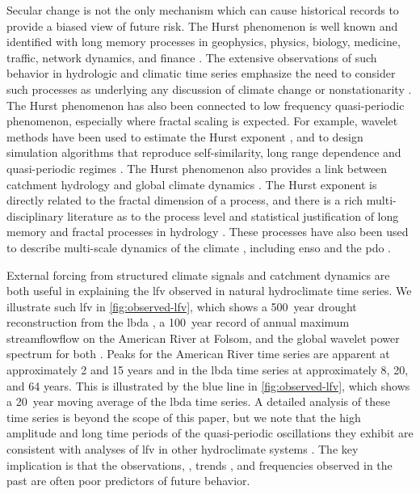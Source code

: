 \documentclass[
  draft,
  linenumbers
]{agujournal2019}
\begin{document}
Secular change is not the only mechanism which can cause historical records to provide a biased view of future risk.
The Hurst phenomenon is well known and identified with long memory processes in geophysics, physics, biology, medicine, traffic, network dynamics, and finance \citep{oconnell:2016}.
The extensive observations of such behavior in hydrologic and climatic time series emphasize the need to consider such processes as underlying any discussion of climate change or nonstationarity \citep{koutsoyiannis:2003,markonis:2013,Palmer:1993ef}.
The Hurst phenomenon has also been connected to low frequency quasi-periodic phenomenon, especially where fractal scaling is expected.
For example, wavelet methods have been used to estimate the Hurst exponent \citep{simonsen:1998,chamoli:2007}, and to design simulation algorithms that reproduce self-similarity, long range dependence and quasi-periodic regimes \citep{Kwon:2007fj,bullmore:2001,geweke:1983,feng:2005}.
The Hurst phenomenon also provides a link between catchment hydrology and global climate dynamics \citep{bloschl:2010,montanari:2003}.
The Hurst exponent is directly related to the fractal dimension of a process, and there is a rich multi-disciplinary literature as to the process level and statistical justification of long memory and fractal processes in hydrology \citep{mandelbrot:1985,mandelbrot:1969,beran:1994}.
These processes have also been used to describe multi-scale dynamics of the climate \citep{lovejoy:2012,lovejoy:2013a,lovejoy:2013,selvam:2017}, including \gls{enso} \citep{maruyama:2018,zivkovic:2013} and the \gls{pdo} \citep{Mantua:1997kj}.

External forcing from structured climate signals \citep[``teleconnections'';][]{Angstrom:1935ej} and catchment dynamics are both useful in explaining the \gls{lfv} observed in natural hydroclimate time series.
We illustrate such \gls{lfv} in \cref{fig:observed-lfv}, which shows a \SI{500}{year} drought reconstruction from the \gls{lbda} \citep{Cook:2010bz}, a \SI{100}{year} record of annual maximum streamflowflow on the American River at Folsom, and the global wavelet power spectrum for both \citep{Torrence:1998jp,Roesch:wlBQQoIs}.
Peaks for the American River time series are apparent at approximately 2 and 15 years and in the \gls{lbda} time series at approximately 8, 20, and 64 years.
This is illustrated by the blue line in  \cref{fig:observed-lfv}, which shows a \SI{20}{year} moving average of the \gls{lbda} time series.
A detailed analysis of these time series is beyond the scope of this paper, but we note that the high amplitude and long time periods of the quasi-periodic oscillations they exhibit are consistent with analyses of \gls{lfv} in other hydroclimate systems \citep{Kiem:2002kq,Swierczynski:2012km,Woollings:2014kd,Hodgkins:2017hw}.
The key implication is that the observations, \citep{Jain:2001hz}, trends \citep{bhattacharya:1983}, and frequencies \citep{newman:2016} observed in the past are often poor predictors of future behavior.
\end{document}
